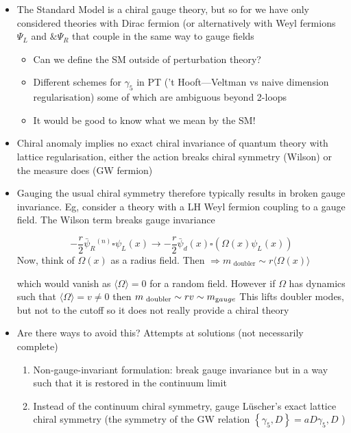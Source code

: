 \begin{itemize}
  \item The Standard Model is a chiral gauge theory, but so for we have only considered theories with Dirac fermion (or alternatively with Weyl fermions \(\Psi_{L}\) and \(\& \Psi_{R}\) that couple in the same way to gauge fields
  \begin{itemize}
  \item Can we define the SM outside of perturbation theory?
  \item Different schemes for \(\gamma_{5}\) in PT ('t Hooft---Veltman vs naive dimension regularisation) some of which are ambiguous beyond 2-loops
  \item It would be good to know what we mean by the SM!
  \end{itemize}
\item Chiral anomaly implies no exact chiral invariance of quantum theory with lattice regularisation, either the action breaks chiral symmetry (Wilson) or the measure does (GW fermion)
  \item Gauging the usual chiral symmetry therefore typically results in broken gauge invariance. Eg, consider a theory with a LH Weyl fermion coupling to a gauge field. The Wilson term breaks gauge invariance

\begin{equation}
 -\frac{r}{2} \bar{\psi}_{R}{ }^{(n)} \square \psi_{L}(x) \rightarrow-\frac{r}{2} \bar{\psi}_{d}(x) \square\left(\Omega(x) \psi_{L}(x)\right) 
\end{equation}
Now, think of \(\Omega(x)\)  as a radius field. Then $\Rightarrow m_{\text { doubler}} \sim r\langle\Omega(x)\rangle$

which would vanish as \(\langle\Omega\rangle=0\) for a random field.
However if \(\Omega\) has dynamics such that \(\langle\Omega\rangle=v \neq 0\) then 
$m_{\text { doubler}}\sim r v \sim m_{\text gauge}$
This lifts doubler modes, but not to the cutoff so it does not really provide a chiral theory

  \item Are there ways to avoid this?
Attempts at solutions (not necessarily complete)
\begin{enumerate}
    \item Non-gauge-invariant formulation: break gauge invariance but in a way such that it is restored in the continuum limit
 \item Instead of the continuum chiral symmetry, gauge L\"uscher's exact lattice chiral symmetry (the symmetry of the GW relation \(\left\{\gamma_{5}, D\right\}=a D \gamma_{5}, D\) )


\end{enumerate}
\end{itemize}
